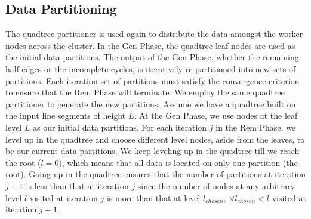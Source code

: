 
\subsection{Data Partitioning}
\label{sec:partitioning_ddcel}



The quadtree partitioner is used again to distribute the data amongst the worker nodes across the cluster. In the Gen Phase, the quadtree leaf nodes are used as the initial data partitions.
The output of the Gen Phase, whether the remaining half-edges or the incomplete cycles, is iteratively re-partitioned into new sets of partitions.
Each iteration set of partitions must satisfy the convergence criterion to ensure that the Rem Phase will terminate.
We employ the same quadtree partitioner to generate the new partitions. 
Assume we have a quadtree built on the input line segments of height $L$. 
At the Gen Phase, we use nodes at the leaf level $L$ as our initial data partitions. For each iteration $j$ in the Rem Phase, we level up in the quadtree and choose different level nodes, aside from the leaves, to be our current data partitions.  
We keep leveling up in the quadtree till we reach the root ($l=0$), which means that all data is located on only one partition (the root).
Going up in the quadtree ensures that the number of partitions at iteration $j+1$ is less than that at iteration $j$ since the number of nodes at any arbitrary level $l$ visited at iteration $j$ is more than that at level $l_{chosen}, \ \forall l_{chosen} < l$ visited at iteration $j+1$.


